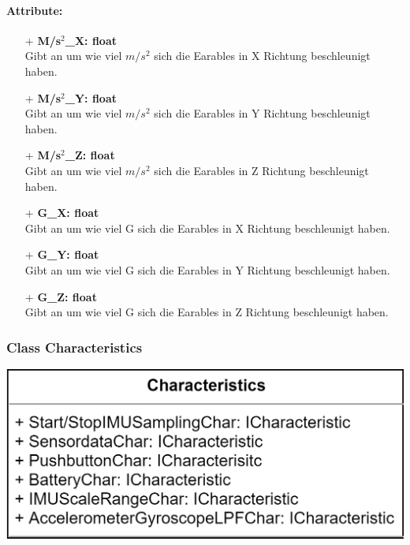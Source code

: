 \documentclass[a4paper,12pt]{article}
\begin{document}
\paragraph{Attribute:}
\begin{itemize}
	\item[+] \textbf{M/s$^2$\_X: float}\\Gibt an um wie viel $m/s^2$ sich die \Gls{Earables} in X Richtung beschleunigt haben.
	\item[+] \textbf{M/s$^2$\_Y: float}\\Gibt an um wie viel $m/s^2$ sich die \Gls{Earables} in Y Richtung beschleunigt haben.
	\item[+] \textbf{M/s$^2$\_Z: float}\\Gibt an um wie viel $m/s^2$ sich die \Gls{Earables} in Z Richtung beschleunigt haben.
	\item[+] \textbf{G\_X: float}\\Gibt an um wie viel G sich die \Gls{Earables} in X Richtung beschleunigt haben.
	\item[+] \textbf{G\_Y: float}\\Gibt an um wie viel G sich die \Gls{Earables} in Y Richtung beschleunigt haben.
	\item[+] \textbf{G\_Z: float}\\Gibt an um wie viel G sich die \Gls{Earables} in Z Richtung beschleunigt haben.
\end{itemize}


\begin{minipage}[b]{0.7\textwidth}
	\subsubsection{Class Characteristics}
	\end{minipage}
	\begin{minipage}[c]{0.3\textwidth}
	\includegraphics[width=1.2\textwidth]{bilder/BibPackageKlassen/Characteristics.png}
\end{minipage}
\end{document}
